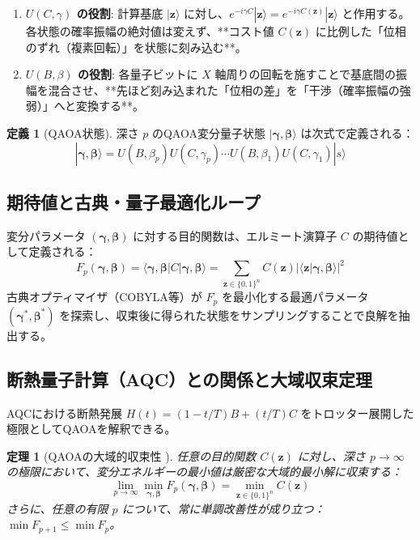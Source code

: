 \documentclass[11pt,a4paper]{ltjsarticle}
\theoremstyle{definition}
\newtheorem{definition}{定義}[section]
\theoremstyle{plain}
\newtheorem{theorem}{定理}[section]
\theoremstyle{remark}
\newcommand{\ket}[1]{|#1\rangle}
\newcommand{\bra}[1]{\langle#1|}
\newcommand{\braket}[2]{\langle#1|#2\rangle}
\begin{document}
\begin{conceptbox}[2つのユニタリの役割分担]
\begin{enumerate}
    \item \textbf{$U(C, \gamma)$ の役割}: 計算基底 $\ket{\bm{z}}$ に対し、$e^{-i \gamma C} \ket{\bm{z}} = e^{-i \gamma C(\bm{z})} \ket{\bm{z}}$ と作用する。各状態の確率振幅の絶対値は変えず、**コスト値 $C(\bm{z})$ に比例した「位相のずれ（複素回転）」を状態に刻み込む**。
    \item \textbf{$U(B, \beta)$ の役割}: 各量子ビットに $X$ 軸周りの回転を施すことで基底間の振幅を混合させ、**先ほど刻み込まれた「位相の差」を「干渉（確率振幅の強弱）」へと変換する**。
\end{enumerate}
\end{conceptbox}

\begin{definition}[QAOA状態]
深さ $p$ のQAOA変分量子状態 $\ket{\bm{\gamma}, \bm{\beta}}$ は次式で定義される：
\begin{equation}
\ket{\bm{\gamma}, \bm{\beta}} = U(B, \beta_p) U(C, \gamma_p) \cdots U(B, \beta_1) U(C, \gamma_1) \ket{s}
\end{equation}
\end{definition}

\subsection{期待値と古典・量子最適化ループ}
変分パラメータ $(\bm{\gamma}, \bm{\beta})$ に対する目的関数は、エルミート演算子 $C$ の期待値として定義される：
\begin{equation}
F_p(\bm{\gamma}, \bm{\beta}) = \bra{\bm{\gamma}, \bm{\beta}} C \ket{\bm{\gamma}, \bm{\beta}} = \sum_{\bm{z} \in \{0, 1\}^n} C(\bm{z}) |\braket{\bm{z}}{\bm{\gamma}, \bm{\beta}}|^2
\end{equation}
古典オプティマイザ（COBYLA等）が $F_p$ を最小化する最適パラメータ $(\bm{\gamma}^*, \bm{\beta}^*)$ を探索し、収束後に得られた状態をサンプリングすることで良解を抽出する。

\subsection{断熱量子計算（AQC）との関係と大域収束定理}
AQCにおける断熱発展 $H(t) = (1 - t/T) B + (t/T) C$ をトロッター展開した極限としてQAOAを解釈できる。

\begin{theorem}[QAOAの大域的収束性 \cite{farhi2014quantum}]
任意の目的関数 $C(\bm{z})$ に対し、深さ $p \to \infty$ の極限において、変分エネルギーの最小値は厳密な大域的最小解に収束する：
\begin{equation}
\lim_{p \to \infty} \min_{\bm{\gamma}, \bm{\beta}} F_p(\bm{\gamma}, \bm{\beta}) = \min_{\bm{z} \in \{0, 1\}^n} C(\bm{z})
\end{equation}
さらに、任意の有限 $p$ について、常に単調改善性が成り立つ：$\min F_{p+1} \le \min F_p$。
\end{theorem}
\end{document}
